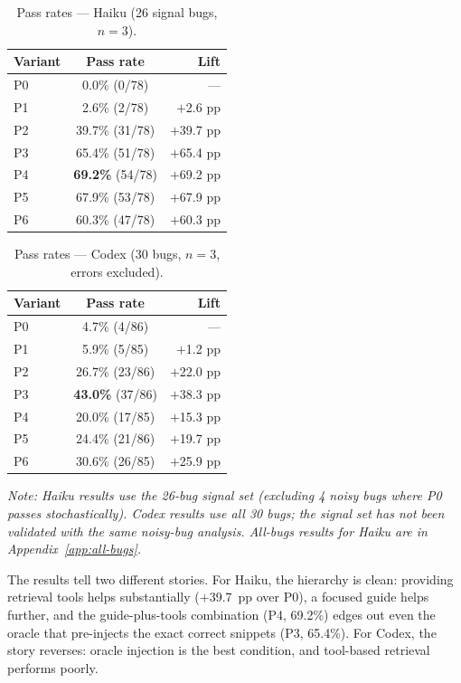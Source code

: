 \documentclass[10pt,conference]{IEEEtran}
\begin{document}
\begin{table}[t]
\centering
\caption{Pass rates --- Haiku (26 signal bugs, $n{=}3$).}
\label{tab:results-haiku}
\small
\begin{tabular}{@{}lcr@{}}
\toprule
\textbf{Variant} & \textbf{Pass rate} & \textbf{Lift} \\
\midrule
P0 & 0.0\% (0/78)    & ---         \\
P1 & 2.6\% (2/78)    & $+$2.6 pp   \\
P2 & 39.7\% (31/78)  & $+$39.7 pp  \\
P3 & 65.4\% (51/78)  & $+$65.4 pp  \\
P4 & \textbf{69.2\%} (54/78) & $+$69.2 pp \\
P5 & 67.9\% (53/78)  & $+$67.9 pp  \\
P6 & 60.3\% (47/78)  & $+$60.3 pp  \\
\bottomrule
\end{tabular}
\end{table}

\begin{table}[t]
\centering
\caption{Pass rates --- Codex (30 bugs, $n{=}3$, errors excluded).}
\label{tab:results-codex}
\small
\begin{tabular}{@{}lcr@{}}
\toprule
\textbf{Variant} & \textbf{Pass rate} & \textbf{Lift} \\
\midrule
P0 & 4.7\% (4/86)    & ---         \\
P1 & 5.9\% (5/85)    & $+$1.2 pp   \\
P2 & 26.7\% (23/86)  & $+$22.0 pp  \\
P3 & \textbf{43.0\%} (37/86) & $+$38.3 pp \\
P4 & 20.0\% (17/85)  & $+$15.3 pp  \\
P5 & 24.4\% (21/86)  & $+$19.7 pp  \\
P6 & 30.6\% (26/85)  & $+$25.9 pp  \\
\bottomrule
\end{tabular}
\end{table}

\emph{Note: Haiku results use the 26-bug signal set (excluding 4 noisy bugs where P0 passes stochastically). Codex results use all 30 bugs; the signal set has not been validated with the same noisy-bug analysis. All-bugs results for Haiku are in Appendix~\ref{app:all-bugs}.}

The results tell two different stories. For Haiku, the hierarchy is clean: providing retrieval tools helps substantially ($+$39.7~pp over P0), a focused guide helps further, and the guide-plus-tools combination (P4, 69.2\%) edges out even the oracle that pre-injects the exact correct snippets (P3, 65.4\%). For Codex, the story reverses: oracle injection is the best condition, and tool-based retrieval performs poorly.
\end{document}
